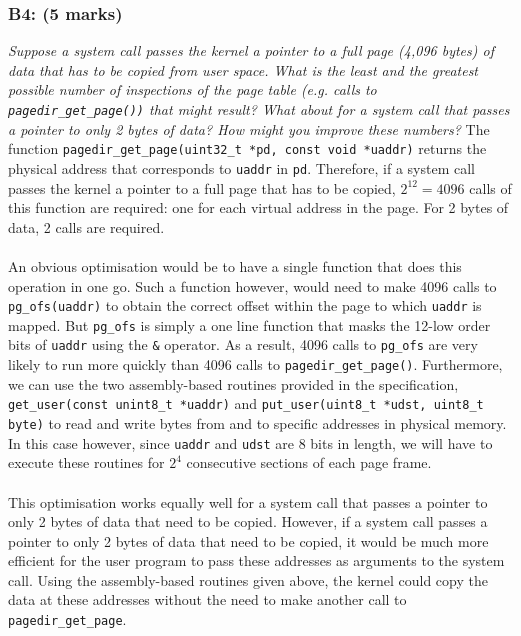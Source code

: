 \documentclass{article}
\begin{document}
\subsubsection*{B4: (5 marks) }
\textit{Suppose a system call passes the kernel a pointer to a full page (4,096
bytes) of data that has to be copied from user space. What is the least and the
greatest possible number of inspections of the page table (e.g. calls to
\texttt{pagedir\_get\_page())} that might result? What about for a system
 call that passes a pointer to only 2 bytes of data? How might you improve these
numbers? }
\newline
\newline
The function \texttt{pagedir\_get\_page(uint32\_t *pd, const void *uaddr)} returns the physical address that corresponds to \texttt{uaddr} in \texttt{pd}. Therefore, if a system call passes the kernel a pointer to a full page that has to be copied, $2^{12} = 4096$ calls of this function are required: one for each virtual address in the page. For 2 bytes of data, 2 calls are required.
\\ \\
An obvious optimisation would be to have a single function that does this operation in one go. Such a function however, would need to make 4096 calls to \texttt{pg\_ofs(uaddr)} to obtain the correct offset within the page to which \texttt{uaddr} is mapped. But \texttt{pg\_ofs} is simply a one line function that masks the 12-low order bits of \texttt{uaddr} using the \texttt{\&} operator. As a result, 4096 calls to \texttt{pg\_ofs} are very likely to run more quickly than 4096 calls to \texttt{pagedir\_get\_page()}. Furthermore, we can use the two assembly-based routines provided in the specification, \texttt{get\_user(const unint8\_t *uaddr)} and \texttt{put\_user(uint8\_t *udst, uint8\_t byte)} to read and write bytes from and to specific addresses in physical memory. In this case however, since \texttt{uaddr} and \texttt{udst} are 8 bits in length, we will have to execute these routines for $2^{4}$ consecutive sections of each page frame.
\\ \\
This optimisation works equally well for a system call that passes a pointer to only 2 bytes of data that need to be copied. However, if a system call passes a pointer to only 2 bytes of data that need to be copied, it would be much more efficient for the user program to pass these addresses as arguments to the system call. Using the assembly-based routines given above, the kernel could copy the data at these addresses without the need to make another call to \texttt{pagedir\_get\_page}.
\end{document}
